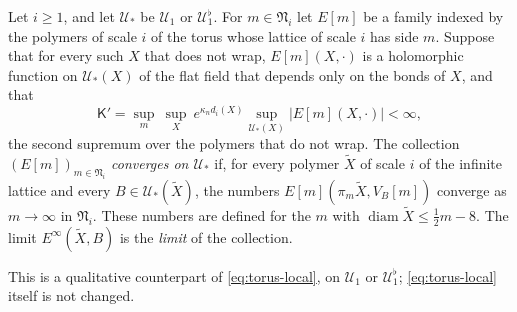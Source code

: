 \begin{definition}\label{def:gl-convergent}
Let $i\ge1$, and let $\mathcal U_*$ be $\mathcal U_1$ or $\mathcal U^\flat_1$. For $m\in\mathfrak N_i$ let $E[m]$ be a family indexed by the polymers of scale $i$ of the torus whose lattice of scale $i$ has side $m$. Suppose that for every such $X$ that does not wrap, $E[m](X,\cdot)$ is a holomorphic function on $\mathcal U_*(X)$ of the flat field that depends only on the bonds of $X$, and that
\[
\mathsf K'=\sup_m\ \sup_X\ e^{\kappa_nd_i(X)}\sup_{\mathcal U_*(X)}|E[m](X,\cdot)|<\infty,
\]
the second supremum over the polymers that do not wrap. The collection $(E[m])_{m\in\mathfrak N_i}$ \emph{converges on $\mathcal U_*$} if, for every polymer $\tilde X$ of scale $i$ of the infinite lattice and every $B\in\mathcal U_*(\tilde X)$, the numbers $E[m](\pi_m\tilde X,V_B[m])$ converge as $m\to\infty$ in $\mathfrak N_i$. These numbers are defined for the $m$ with $\operatorname{diam}\tilde X\le\frac12m-8$. The limit $E^\infty(\tilde X,B)$ is the \emph{limit} of the collection.
\end{definition}

This is a qualitative counterpart of \eqref{eq:torus-local}, on $\mathcal U_1$ or $\mathcal U^\flat_1$; \eqref{eq:torus-local} itself is not changed.

